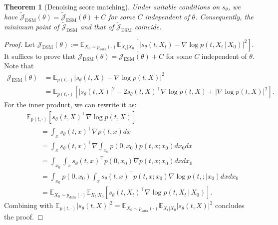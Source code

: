 \documentclass[letterpaper,11pt,reqno]{amsart}
\newtheorem{theorem}{Theorem}[section]
\numberwithin{equation}{section}
\begin{document}
\begin{theorem}[Denoising score matching]
\cite{Vi11}
\label{thm:DSM}
Under suitable conditions on $s_\theta$, we have 
$\tilde{\mathcal{J}}_{\text{DSM}}(\theta) = \tilde{\mathcal{J}}_{\text{ESM}}(\theta) + C$ for some $C$ independent of $\theta$. 
Consequently, 
the minimum point of $\tilde{\mathcal{J}}_{\text{DSM}}$ and that of $\tilde{\mathcal{J}}_{\text{ESM}}$ coincide. 
\end{theorem}
\begin{proof}
Let 
$\mathcal{J}_{\text{DSM}}(\theta):= \mathbb{E}_{X_0\sim p_{data}(\cdot)} \mathbb{E}_{X_t | X_0}\left[\left|s_{\theta}(t,X_t)-\nabla \log p(t,X_t \,|\, X_0)\right|^2\right]$.
It suffices to prove that $\mathcal{J}_{\text{DSM}}(\theta) = \mathcal{J}_{\text{ESM}}(\theta) + C$ for some $C$
independent of $\theta$.
Note that
\begin{equation*}
\begin{aligned}
\mathcal{J}_{\text{ESM}}(\theta) 
& = \mathbb{E}_{p(t, \cdot)} |s_\theta(t,X) - \nabla \log p(t,X)|^2\\
& = \mathbb{E}_{p(t, \cdot)} \left[|s_\theta(t,X)|^2 - 2 s_\theta(t,X)^{\top}\nabla \log p(t,X)+|\nabla \log p(t,X)|^2\right].
\end{aligned}
\end{equation*}
For the inner product, we can rewrite it as:
\begin{equation*}
\begin{aligned}
& \mathbb{E}_{p(t, \cdot)} \left[s_\theta(t,X)^{\top}\nabla \log p(t,X)\right] \\
& \qquad = \int_{x}s_\theta(t,x)^{\top}\nabla p(t,x) dx\\
& \qquad = \int_{x}
s_\theta(t,x)^{\top}\nabla 
\int_{x_0}p(0,x_0)p(t,x; x_0)dx_0 dx\\
& \qquad = \int_{x_0}\int_{x}
s_\theta(t,x)^{\top} 
p(0,x_0)\nabla p(t,x; x_0)dx dx_0 \\
& \qquad = \int_{x_0}p(0,x_0)\int_{x}
s_\theta(t,x)^{\top} 
p(t,x; x_0) \nabla \log p(t,; |x_0)dx dx_0\\
& \qquad = \mathbb{E}_{X_0\sim p_{data}(\cdot)} \mathbb{E}_{X_t | X_0} \left[s_{\theta}(t,X_t)^{\top}\nabla \log p(t,X_t \,|\, X_0)\right].
\end{aligned}
\end{equation*}
Combining with $\mathbb{E}_{p(t, \cdot)} |s_\theta(t,X)|^2=\mathbb{E}_{X_0 \sim p_{data}(\cdot)} \mathbb{E}_{X_t | X_0}|s_\theta(t,X)|^2$ 
concludes the proof.
\end{proof}
\end{document}
